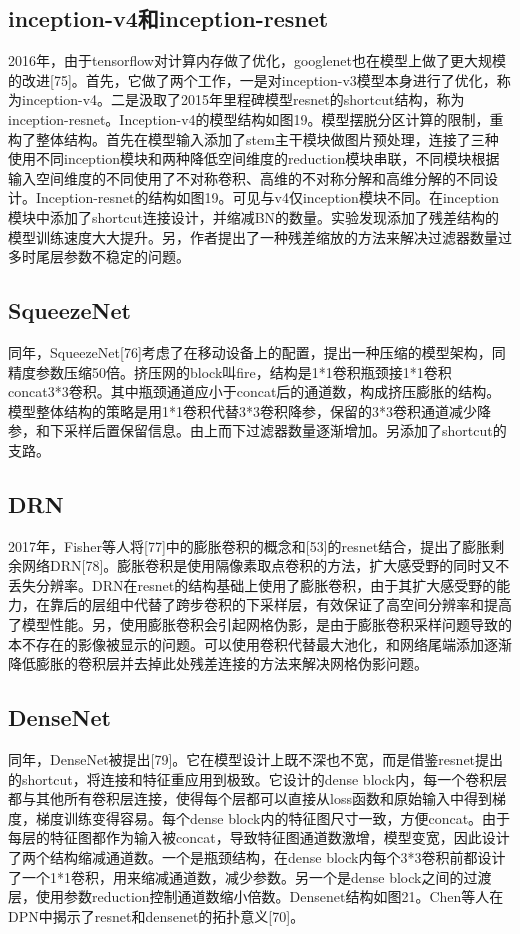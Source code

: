 \documentclass[15pt]{article}
\begin{document}
\subsection{inception-v4和inception-resnet}
2016年，由于tensorflow对计算内存做了优化，googlenet也在模型上做了更大规模的改进[75]。首先，它做了两个工作，一是对inception-v3模型本身进行了优化，称为inception-v4。二是汲取了2015年里程碑模型resnet的shortcut结构，称为inception-resnet。Inception-v4的模型结构如图19。模型摆脱分区计算的限制，重构了整体结构。首先在模型输入添加了stem主干模块做图片预处理，连接了三种使用不同inception模块和两种降低空间维度的reduction模块串联，不同模块根据输入空间维度的不同使用了不对称卷积、高维的不对称分解和高维分解的不同设计。Inception-resnet的结构如图19。可见与v4仅inception模块不同。在inception模块中添加了shortcut连接设计，并缩减BN的数量。实验发现添加了残差结构的模型训练速度大大提升。另，作者提出了一种残差缩放的方法来解决过滤器数量过多时尾层参数不稳定的问题。

\subsection{SqueezeNet}
同年，SqueezeNet[76]考虑了在移动设备上的配置，提出一种压缩的模型架构，同精度参数压缩50倍。挤压网的block叫fire，结构是1*1卷积瓶颈接1*1卷积concat3*3卷积。其中瓶颈通道应小于concat后的通道数，构成挤压膨胀的结构。模型整体结构的策略是用1*1卷积代替3*3卷积降参，保留的3*3卷积通道减少降参，和下采样后置保留信息。由上而下过滤器数量逐渐增加。另添加了shortcut的支路。

\subsection{DRN}
2017年，Fisher等人将[77]中的膨胀卷积的概念和[53]的resnet结合，提出了膨胀剩余网络DRN[78]。膨胀卷积是使用隔像素取点卷积的方法，扩大感受野的同时又不丢失分辨率。DRN在resnet的结构基础上使用了膨胀卷积，由于其扩大感受野的能力，在靠后的层组中代替了跨步卷积的下采样层，有效保证了高空间分辨率和提高了模型性能。另，使用膨胀卷积会引起网格伪影，是由于膨胀卷积采样问题导致的本不存在的影像被显示的问题。可以使用卷积代替最大池化，和网络尾端添加逐渐降低膨胀的卷积层并去掉此处残差连接的方法来解决网格伪影问题。

\subsection{DenseNet}
同年，DenseNet被提出[79]。它在模型设计上既不深也不宽，而是借鉴resnet提出的shortcut，将连接和特征重应用到极致。它设计的dense block内，每一个卷积层都与其他所有卷积层连接，使得每个层都可以直接从loss函数和原始输入中得到梯度，梯度训练变得容易。每个dense block内的特征图尺寸一致，方便concat。由于每层的特征图都作为输入被concat，导致特征图通道数激增，模型变宽，因此设计了两个结构缩减通道数。一个是瓶颈结构，在dense block内每个3*3卷积前都设计了一个1*1卷积，用来缩减通道数，减少参数。另一个是dense block之间的过渡层，使用参数reduction控制通道数缩小倍数。Densenet结构如图21。Chen等人在DPN中揭示了resnet和densenet的拓扑意义[70]。
\end{document}
